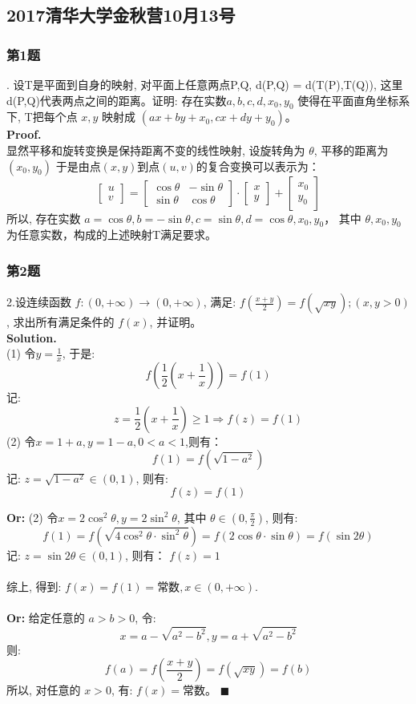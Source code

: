 \documentclass[UTF8]{article}
\begin{document}
\subsection{2017清华大学金秋营10月13号}
\subsubsection{第1题}
. 设T是平面到自身的映射, 对平面上任意两点P,Q, d(P,Q) = d(T(P),T(Q)), 这里d(P,Q)代表两点之间的距离。证明: 存在实数$a,b,c,d,x_0,y_0$ 使得在平面直角坐标系下, T把每个点 $x,y$ 映射成 $(ax+by+x_0, cx+dy+y_0)$。\\
\textbf{Proof.} \\
显然平移和旋转变换是保持距离不变的线性映射, 设旋转角为 $\theta$, 平移的距离为$(x_0,y_0)$ 于是由点$(x,y)$到点$(u,v)$的复合变换可以表示为： \\
$$
\begin{bmatrix}
u \\
v
\end{bmatrix} =
\begin{bmatrix}
\cos \theta & -\sin \theta \\
\sin \theta & \cos \theta 
\end{bmatrix} \cdot 
\begin{bmatrix}
x \\
y
\end{bmatrix} + 
\begin{bmatrix}
x_0 \\
y_0
\end{bmatrix}
$$
所以, 存在实数 $a=\cos \theta, b=-\sin \theta, c=\sin \theta, d=\cos \theta, x_0,y_0$， 其中 $\theta, x_0,y_0$ 为任意实数，构成的上述映射T满足要求。

\subsubsection{第2题}
\noindent 2.设连续函数 $f: (0,+\infty) \longrightarrow (0,+\infty)$, 满足: $f(\frac{x+y}{2}) = f(\sqrt{xy}); (x,y>0)$ , 求出所有满足条件的 $f(x)$, 并证明。\\
\textbf{Solution.} \\
(1) 令$y=\frac{1}{x}$, 于是:
$$f\left (\frac{1}{2}(x+\frac{1}{x})\right) = f(1)$$
记: 
$$z=\frac{1}{2}(x+\frac{1}{x}) \ge 1 \Longrightarrow f(z) = f(1) $$
(2) 令$x=1+a,y=1-a , 0<a<1$,则有：
$$f(1) = f(\sqrt{1-a^2})$$
记:  $z=\sqrt{1-a^2} \in (0,1)$, 则有:
$$f(z) = f(1)$$

\noindent \textbf{Or: }(2) 令$x=2\cos^2\theta, y=2\sin^2\theta$, 其中 $\theta \in (0,\frac{\pi}{2})$, 则有:
$$f(1) = f(\sqrt{4\cos^2\theta \cdot \sin^2\theta}) = f(2\cos\theta \cdot \sin \theta) = f(\sin 2\theta)$$
记: $z=\sin2\theta \in (0,1)$, 则有： $f(z) =1$
\\
\\
综上, 得到: $f(x)=f(1) = \text{常数}, x\in (0,+\infty).$
\\
\\
\noindent \textbf{Or:} 给定任意的 $a>b>0$, 令:
$$ x = a - \sqrt{a^2-b^2}, y = a + \sqrt{a^2-b^2}$$
则:
$$ f(a) = f(\frac{x+y}{2}) = f(\sqrt{xy}) = f(b) $$
所以, 对任意的 $x>0$, 有: $f(x) = $常数。 $\blacksquare$
\end{document}

